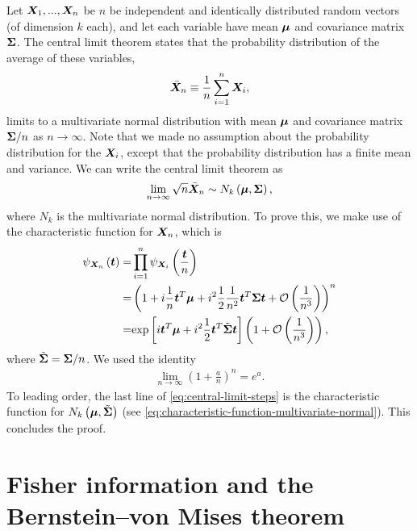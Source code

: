 Let ${\bm X}_1,...,{\bm X}_n$ be $n$ be independent and identically distributed 
random vectors (of dimension $k$ each), 
and let each variable have mean ${\bm \mu}$ and covariance matrix ${\bm \Sigma}$.
The central limit theorem states that the probability distribution of the
average of these variables, 
\begin{align}
    \bar{{\bm X}}_n
    \equiv
    \frac{1}{n}\sum_{i=1}^n{\bm X}_i
    ,
\end{align}
limits to a multivariate normal distribution with mean ${\bm \mu}$ and covariance matrix ${\bm \Sigma}/n$
as $n\to\infty$.
Note that we made no assumption about the probability distribution for
the ${\bm X}_i$, except that the probability distribution has a finite mean
and variance.
We can write the central limit theorem as
\begin{align}
    \lim_{n\to\infty} \sqrt{n}\bar{{\bm X}}_n
    \sim 
    N_k\left({\bm \mu},{\bm \Sigma}\right)
    ,
\end{align}
where $N_k$ is the multivariate normal distribution.
To prove this, we make use of the characteristic function for ${\bm X}_n$, which is
\begin{align}
    \label{eq:central-limit-steps}
    \psi_{{\bm X}_n}\left({\bm t}\right)
    =&
    \prod_{i=1}^n\psi_{{\bm X}_i}\left(\frac{{\bm t}}{n}\right)
    \nonumber\\
    =&
    \left(
        1 
        + 
        i\frac{1}{n}{\bm t}^T{\bm \mu} 
        + 
        i^2\frac{1}{2}\frac{1}{n^2}{\bm t}^T{\bm \Sigma}{\bm t} 
        + 
        \mathcal{O}\left(\frac{1}{n^3}\right)
    \right)^n
    \nonumber\\
    =&
    \mathrm{exp}\left[
        i{\bm t}^T{\bm \mu}
        + 
        i^2\frac{1}{2}{\bm t}^T\tilde{{\bm \Sigma}}{\bm t}
    \right]
    \left(1 + \mathcal{O}\left(\frac{1}{n^3}\right)\right)
    ,
\end{align}
where $\tilde{{\bm \Sigma}} = {\bm \Sigma}/n$.
We used the identity
\begin{align}
    \lim_{n\to\infty}\left(1+\frac{a}{n}\right)^n = e^a
    .
\end{align}
To leading order, the last line of \eqref{eq:central-limit-steps} is the characteristic function for $N_k\left({\bm \mu},\tilde{{\bm \Sigma}}\right)$ (see \eqref{eq:characteristic-function-multivariate-normal}).
This concludes the proof.

\section{Fisher information and the Bernstein–von Mises theorem}

